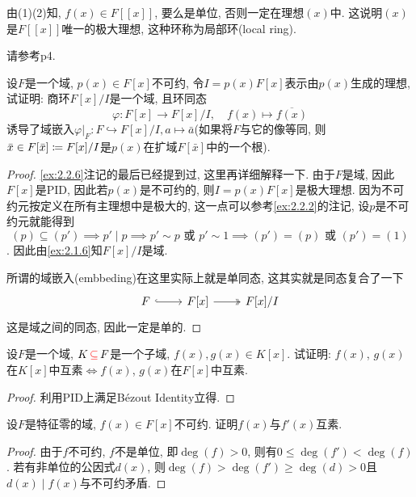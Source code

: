 \begin{remark}
    由(1)(2)知, $f(x) \in F[[x]]$, 要么是单位, 否则一定在理想$(x)$中. 这说明$(x)$是$F[[x]]$唯一的极大理想, 这种环称为局部环(local ring).
    
    请参考\cite{atiyah1994introduction}p4.
\end{remark}

\begin{problem}\label{ex:2.3.2}
    设$F$是一个域, $p(x) \in F[x]$不可约, 令$I = p(x)F[x]$表示由$p(x)$生成的理想, 试证明: 商环$F[x]/I$是一个域, 且环同态
    \[
        \varphi:F[x] \to F[x]/I,\quad f(x) \mapsto \overline{f(x)}
    \]
    诱导了域嵌入$\varphi|_F: F \hookrightarrow F[x]/I, a \mapsto \bar{a}$(如果将$F$与它的像等同, 则$\bar{x} \in F[\bar{x}] \mathrel{\coloneqq} F[x]/I$是$p(x)$在扩域$F[\bar{x}]$中的一个根).
\end{problem}

\begin{proof}
    \ref{ex:2.2.6}注记的最后已经提到过, 这里再详细解释一下. 由于$F$是域, 因此$F[x]$是PID, 因此若$p(x)$是不可约的, 则$I = p(x)F[x]$是极大理想. 因为不可约元按定义在所有主理想中是极大的, 这一点可以参考\ref{ex:2.2.2}的注记, 设$p$是不可约元就能得到
    \[
        (p) \subseteq (p') \implies p' \mid p \implies p' \sim p \text{ 或 } p' \sim 1 \implies (p') = (p) \text{ 或 } (p') = (1)
    \]. 因此由\ref{ex:2.1.6}知$F[x]/I$是域.
    
    所谓的域嵌入(embbeding)在这里实际上就是单同态, 这其实就是同态复合了一下
    \[
        \begin{tikzcd}
            F \arrow[r, hook] & {F[x]} \arrow[r, two heads] & {F[x]/I}
        \end{tikzcd}
    \]
    这是域之间的同态, 因此一定是单的.
\end{proof}

\begin{problem}
    设$F$是一个域, $K \,\textcolor{red}{\subseteq}\, F$是一个子域, $f(x), g(x) \in K[x]$. 试证明: $f(x)$, $g(x)$在$K[x]$中互素$\Leftrightarrow f(x)$, $g(x)$在$F[x]$中互素.
\end{problem}

\begin{proof}
    利用PID上满足Bézout Identity立得.
\end{proof}

\begin{problem}
    设$F$是特征零的域, $f(x) \in F[x]$不可约. 证明$f(x)$与$f'(x)$互素.
\end{problem}

\begin{proof}
    由于$f$不可约, $f$不是单位, 即$\deg(f) > 0$, 则有$0 \leqslant \deg(f') < \deg(f)$. 若有非单位的公因式$d(x)$, 则$\deg(f) > \deg(f') \geqslant \deg(d) > 0$且$d(x) \mid f(x)$与不可约矛盾.
\end{proof}

